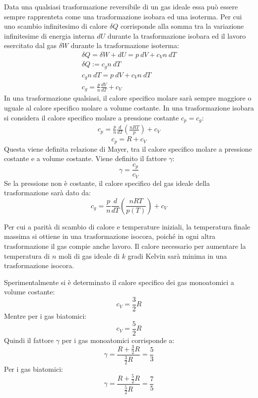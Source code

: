\documentclass{article}
\numberwithin{equation}{subsection}
\begin{document}
Data una qualsiasi trasformazione reversibile di un gas ideale essa può essere sempre rapprenteta come una trasformazione isobara ed una isoterma. Per cui uno scambio infinitesimo di calore $\delta Q$ 
corrisponde alla somma tra la variazione infinitesime di energia interna $dU$ durante la trasformazione isobara ed il lavoro esercitato dal gas $\delta W$ durante la trasformazione isoterma: 
\begin{gather*}
    \delta Q=\delta W+dU=p\:dV+c_Vn\:dT\\
    \delta Q :=c_gn\:dT\\
    c_gn\:dT=p\:dV+c_Vn\:dT\\
    c_g=\displaystyle\frac{p}{n}\frac{dV}{dT}+c_V
\end{gather*}
In una trasformazione qualsiasi, il calore specifico molare sarà sempre maggiore o uguale al calore specifico molare a volume costante. 
In una trasformazione isobara si considera il calore specifico molare a pressione costante $c_p=c_g$: 
\begin{gather*}
    c_p=\displaystyle\frac{p}{n}\frac{d}{dT}\left(\frac{nRT}{p}\right)+c_V
\end{gather*}
\begin{equation}
    c_p=R+c_V
\end{equation}
Questa viene definita relazione di Mayer, tra il 
calore specifico molare a pressione costante e a volume costante. Viene definito il fattore $\gamma$:
\begin{equation}
    \gamma=\displaystyle\frac{c_p}{c_V}
\end{equation}
Se la pressione non è costante, il calore specifico del gas 
ideale della trasformazione sarà dato da:
\begin{equation*}
    c_g=\displaystyle\frac{p}{n}\frac{d}{dT}\left(\frac{nRT}{p(T)}\right)+c_V
\end{equation*}

Per cui a parità di scambio di calore e temperature iniziali, la temperatura finale massima si ottiene in una trasformazione isocora, poiché in ogni altra trasformazione 
il gas compie anche lavoro. Il calore necessario per aumentare la temperatura di $n$ moli di gas ideale di $k$ gradi Kelvin sarà minima in una trasformazione isocora. 


Sperimentalmente si è determinato il calore 
specifico dei gas monoatomici a volume costante: 
\begin{equation}
    c_V=\displaystyle\frac{3}{2}R
\end{equation}
Mentre per i gas biatomici:
\begin{equation}
    c_V=\displaystyle\frac{5}{2}R
\end{equation}
Quindi il fattore $\gamma$ per i gas monoatomici 
corrisponde a: 
\begin{equation}
    \gamma=\displaystyle\frac{R+\frac{3}{2}R}{\frac{3}{2}R}=\frac{5}{3}
\end{equation}
Per i gas biatomici: 
\begin{equation}
    \gamma=\displaystyle\frac{R+\frac{5}{2}R}{\frac{5}{2}R}=\frac{7}{5}
\end{equation}
\end{document}
